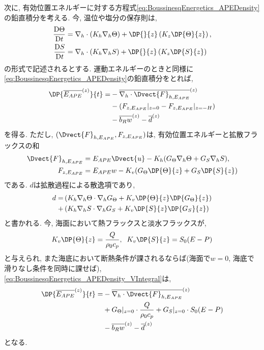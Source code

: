 次に, 有効位置エネルギーに対する方程式\eqref{eq:BoussinesqEnergetics_APEDensity}の鉛直積分を考える.
今, 温位や塩分の保存則は,
\begin{align}
  \DD{\Theta}{t} &= \nabla_h \cdot (K_h \nabla_h \Theta) + \DP{}{z}\left(K_z \DP{\Theta}{z} \right), \\
  \DD{S}{t} &= \nabla_h \cdot (K_h \nabla_h S) + \DP{}{z}\left(K_z \DP{S}{z} \right)
\end{align}
の形式で記述されるとする. 
運動エネルギーのときと同様に\eqref{eq:BoussinesqEnergetics_APEDensity}の鉛直積分をとれば,
\begin{align}
 \DP{\overline{E_{APE}}^{(z)}}{t} 
 =
 & - \overline{ \nabla_h \cdot \Dvect{F}_{h,E_{APE}} }^{(z)}                   \nonumber \\
 & - \left(F_{z,E_{APE}}|_{z=0} - F_{z,E_{APE}}|_{z=-H}  \right)                \nonumber \\
 & - \overline{b_R w}^{(z)}
   - \overline{d}^{(z)}
\label{eq:BoussinesqEnergetics_APEDensity_VIntegral} 
\end{align}
を得る.
ただし, $(\Dvect{F}_{h,E_{APE}},F_{z,E_{APE}})$は, 有効位置エネルギーと拡散フラックスの和
\begin{align}
  \Dvect{F}_{h,E_{APE}} &= E_{APE} \Dvect{u} - K_h (G_\Theta\nabla_h\Theta + G_S\nabla_h S), \\
  F_{z,E_{APE}} &= E_{APE} w - K_v (G_\Theta\DP{\Theta}{z} + G_S\DP{S}{z})
\end{align}
である.
$d$は拡散過程による散逸項であり,
\begin{align}
 d =
     &\left(K_h \nabla_h \Theta \cdot \nabla_h G_\Theta  + K_v \DP{\Theta}{z}\DP{G_\Theta}{z} \right) \\
   + &\left(K_h \nabla_h S \cdot \nabla_h G_S  + K_v \DP{S}{z}\DP{G_S}{z} \right)
\end{align}
と書かれる.
今, 海面において熱フラックスと淡水フラックスが,
\begin{align*}
 K_v \DP{\Theta}{z} = \dfrac{Q}{\rho_0 c_p}, \;\;
 K_v \DP{S}{z} = S_0 (E - P)
\end{align*}
と与えられ, また海底において断熱条件が課されるならば(海面で$w=0$, 海底で滑りなし条件を同時に課せば),
\eqref{eq:BoussinesqEnergetics_APEDensity_VIntegral}は, 
\begin{align}
 \DP{\overline{E_{APE}}^{(z)}}{t} 
 =
 & - \overline{ \nabla_h \cdot \Dvect{F}_{h,E_{APE}} }^{(z)}                   \nonumber \\
 & + G_\Theta|_{z=0} \cdot \dfrac{Q}{\rho_0 c_p} + G_S|_{z=0} \cdot S_0(E - P)                     \nonumber \\
 & - \overline{b_R w}^{(z)}
   - \overline{d}^{(z)}
\label{eq:BoussinesqEnergetics_APEDensity_VIntegral_applyBC} 
\end{align}
となる. 


